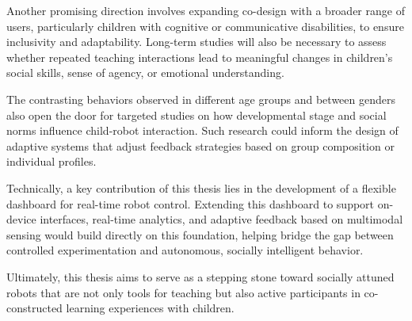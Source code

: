 \documentclass[a4paper]{usiinfbachelorproject}
\begin{document}
Another promising direction involves expanding co-design with a broader range of users, particularly children with cognitive or communicative disabilities, to ensure inclusivity and adaptability.
Long-term studies will also be necessary to assess whether repeated teaching interactions lead to meaningful changes in children's social skills, sense of agency, or emotional understanding.

The contrasting behaviors observed in different age groups and between genders also open the door for targeted studies on how developmental stage and social norms influence child-robot interaction.
Such research could inform the design of adaptive systems that adjust feedback strategies based on group composition or individual profiles.

Technically, a key contribution of this thesis lies in the development of a flexible dashboard for real-time robot control.
Extending this dashboard to support on-device interfaces, real-time analytics, and adaptive feedback based on multimodal sensing would build directly on this foundation, helping bridge the gap between controlled experimentation and autonomous, socially intelligent behavior.

Ultimately, this thesis aims to serve as a stepping stone toward socially attuned robots that are not only tools for teaching but also active participants in co-constructed learning experiences with children.

\newpage



\end{document}
